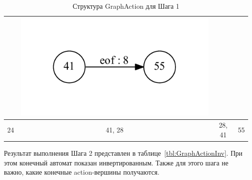 \documentclass{matmex-diploma}
\begin{document}
\begin{table}[h]
\begin{tabular}{ | c | c | c | c | }
    & 
    \begin{minipage}{.22\textwidth}
      \includegraphics[width=\linewidth]{41_tok}
    \end{minipage}    
    \\ \hline
    24 & 41, 28 & 28, 41 & 55
    \\ \hline
  \end{tabular}
  \caption{Структура GraphAction для Шага 1}
  \label{tbl:GraphAction}
\end{table}

Результат выполнения Шага 2 представлен в таблице~\ref{tbl:GraphActionInv}. При этом конечный автомат показан инвертированным. Также для этого шага не важно, какие конечные action-вершины получаются.
\end{document}
